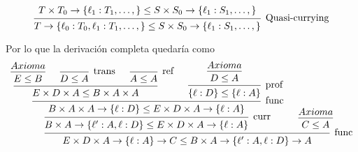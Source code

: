 \documentclass{article}
\newcommand{\x}{\times}
\newcommand{\m}{\rightarrow}
\begin{document}
\begin{enumerate}
\begin{enumerate}
            \[
                \begin{prooftree}
                    \hypo{T \x T_0 \m \{\ell_1 : T_1, \dots, \} \leq 
                    S \x S_0 \m \{\ell_1 : S_1, \dots, \}}
                    \infer 1 [Quasi-currying]
                    {T \m \{\ell_0 : T_0, \ell_1 : T_1, \dots, \} \leq 
                    S \x S_0 \m \{\ell_1 : S_1, \dots, \}}
                \end{prooftree}
            \]

            Por lo que la derivación completa quedaría como 
            \[
                \begin{prooftree}
                    \hypo{Axioma}
                    \infer 1 {E \leq B}

                    \infer 0 [trans] {D \leq A}

                    \infer 0 [ref] {A \leq A}

                    \infer 3 {E \x D \x A \leq B \x A \x A}

                    \hypo{Axioma}
                    \infer 1 {D \leq A}

                    \infer 1 [prof] {\{\ell : D\} \leq \{\ell : A\}}

                    \infer 2 [func] {
                        B \x A \x A \m \{\ell : D\} \leq 
                        E \x D \x A \m \{\ell : A\}
                    }

                    \infer 1 [curr] {
                        B \x A \m \{\ell' : A, \ell : D\} \leq 
                        E \x D \x A \m \{\ell : A\}
                    }

                    \hypo{Axioma}
                    \infer 1 {C \leq A}

                    \infer 2 [func] {
                        E \x D \x A \m \{\ell : A\} \m C \leq
                        B \x A \m \{\ell' : A, \ell : D\} \m A
                    }
                \end{prooftree}
            \]

        \end{enumerate}
    \end{enumerate}
\end{document}
